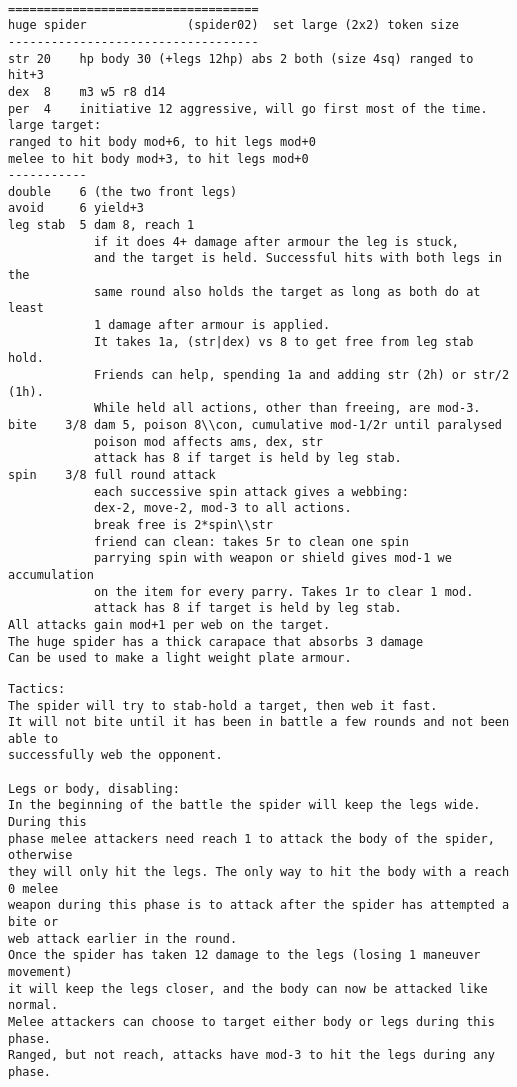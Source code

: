\

\pagebreak[1]
\tiny \begin{samepage} \begin{verbatim}
===================================
huge spider              (spider02)  set large (2x2) token size
-----------------------------------
str 20    hp body 30 (+legs 12hp) abs 2 both (size 4sq) ranged to hit+3
dex  8    m3 w5 r8 d14
per  4    initiative 12 aggressive, will go first most of the time.
large target:
ranged to hit body mod+6, to hit legs mod+0
melee to hit body mod+3, to hit legs mod+0
-----------
double    6 (the two front legs)
avoid     6 yield+3
leg stab  5 dam 8, reach 1
            if it does 4+ damage after armour the leg is stuck,
            and the target is held. Successful hits with both legs in the
            same round also holds the target as long as both do at least
            1 damage after armour is applied.
            It takes 1a, (str|dex) vs 8 to get free from leg stab hold.
            Friends can help, spending 1a and adding str (2h) or str/2 (1h).
            While held all actions, other than freeing, are mod-3.
bite    3/8 dam 5, poison 8\\con, cumulative mod-1/2r until paralysed
            poison mod affects ams, dex, str
            attack has 8 if target is held by leg stab.
spin    3/8 full round attack
            each successive spin attack gives a webbing:
            dex-2, move-2, mod-3 to all actions.
            break free is 2*spin\\str
            friend can clean: takes 5r to clean one spin
            parrying spin with weapon or shield gives mod-1 we accumulation
            on the item for every parry. Takes 1r to clear 1 mod.
            attack has 8 if target is held by leg stab.
All attacks gain mod+1 per web on the target.
The huge spider has a thick carapace that absorbs 3 damage
Can be used to make a light weight plate armour.

\end{verbatim} \end{samepage} \begin{samepage} \begin{verbatim}
Tactics:
The spider will try to stab-hold a target, then web it fast.
It will not bite until it has been in battle a few rounds and not been able to
successfully web the opponent.

Legs or body, disabling:
In the beginning of the battle the spider will keep the legs wide. During this
phase melee attackers need reach 1 to attack the body of the spider, otherwise
they will only hit the legs. The only way to hit the body with a reach 0 melee
weapon during this phase is to attack after the spider has attempted a bite or
web attack earlier in the round.
Once the spider has taken 12 damage to the legs (losing 1 maneuver movement)
it will keep the legs closer, and the body can now be attacked like normal.
Melee attackers can choose to target either body or legs during this phase.
Ranged, but not reach, attacks have mod-3 to hit the legs during any phase.


\end{verbatim}
\end{samepage}
